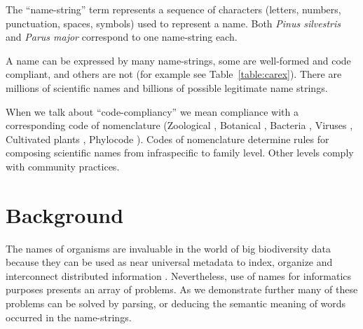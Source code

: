 \documentclass{bmcart}
\begin{document}
The ``name-string'' term represents a sequence of characters (letters, numbers,
punctuation, spaces, symbols) used to represent a name. Both \textit{Pinus
silvestris} and \textit{Parus major} correspond to one name-string each.

A name can be expressed by many name-strings, some are well-formed and code
compliant, and others are not (for example see Table~\ref{table:carex}). There
are millions of scientific names and billions of possible legitimate name
strings.

When we talk about ``code-compliancy'' we mean compliance with a corresponding
code of nomenclature (Zoological \cite{ICZN}, Botanical \cite{ICN},
Bacteria \cite{ICNB}, Viruses \cite{ICTV}, Cultivated plants \cite{ICNCP},
Phylocode \cite{ICPN}). Codes of nomenclature determine rules for composing
scientific names from infraspecific to family level. Other levels comply with
community practices.

\section*{Background}

The names of organisms are invaluable in the world of big biodiversity data
because they can be used as near universal metadata to index, organize and
interconnect distributed information \cite{Patterson2010}. Nevertheless, use of
names for informatics purposes presents an array of problems. As we demonstrate
further many of these problems can be solved by parsing, or deducing the
semantic meaning of words occurred in the name-strings.
\end{document}
